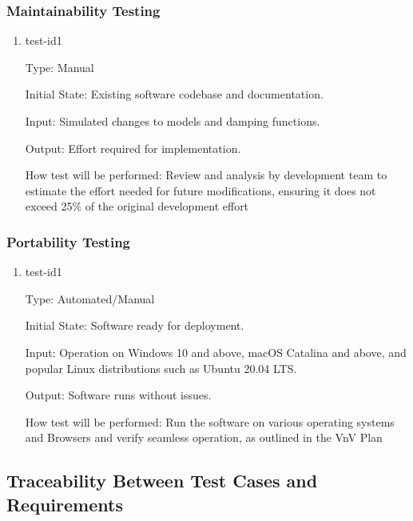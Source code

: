 \documentclass[12pt, titlepage]{article}
\begin{document}
\subsubsection{Maintainability Testing}

\begin{enumerate}

\item{test-id1\\}
  
Type: Manual
          
Initial State: Existing software codebase and documentation.
          
Input: Simulated changes to models and damping functions.
          
Output: Effort required for implementation.
          
How test will be performed: Review and analysis by development team to estimate the 
effort needed for future modifications, ensuring it does not exceed 25\% of the 
original development effort
  
\end{enumerate}


\subsubsection{Portability Testing}

\begin{enumerate}

\item{test-id1\\}
  
Type: Automated/Manual
          
Initial State: Software ready for deployment.
          
Input: Operation on Windows 10 and above, macOS Catalina and above, and popular Linux 
distributions such as Ubuntu 20.04 LTS.
          
Output: Software runs without issues.
          
How test will be performed: Run the software on various operating systems and Browsers 
and verify seamless operation, as outlined in the VnV Plan
  
\end{enumerate}

\newpage

\subsection{Traceability Between Test Cases and Requirements}
\end{document}
